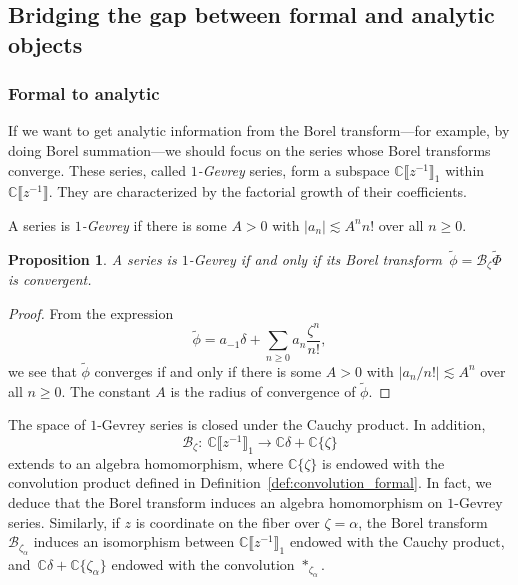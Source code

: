 \documentclass[pdftex]{sigma}
\newcommand{\maps}{\colon}
\newcommand{\C}{\mathbb{C}}
\newcommand{\series}[1]{\tilde{#1}}
\newcommand{\borel}{\mathcal{B}}
\numberwithin{equation}{section}
\newtheorem{Proposition}[Theorem]{Proposition}
 { \theoremstyle{definition}
\newtheorem{Definition}[Theorem]{Definition}
\newtheorem{Remark}[Theorem]{Remark}
\newtheorem*{notation*}{Notation}
}
\begin{document}
\subsection{Bridging the gap between formal and analytic objects}\label{sec:bridging}

\subsubsection{Formal to analytic}\label{sec:Borel-gevrey}
If we want to get analytic information from the Borel transform---for example, by doing Borel summation---we should focus on the series whose Borel transforms converge. These series, called {\em $1$-Gevrey} series, form a subspace $\C \big\llbracket z^{-1} \big\rrbracket_1$ within $\C \big\llbracket z^{-1} \big\rrbracket$. They are characterized by the factorial growth of their coefficients.
\begin{Definition}
A series
is {\em $1$-Gevrey} if there is some $A > 0$ with $|a_n| \lesssim A^n n!$ over all $n \ge 0$.
\end{Definition}
\begin{Proposition}\label{prop:gevrey_to_convergent}
A series
\smash{$ \series{\Phi} = \sum_{n \ge -1} a_n z^{-n-1}$}
is $1$-Gevrey if and only if its Borel transform~${\series{\phi} = \borel_\zeta \series{\Phi}}$ is convergent.
\end{Proposition}
\begin{proof}
From the expression
\[ \series{\phi} = a_{-1} \delta + \sum_{n \ge 0} a_n \frac{\zeta^n}{n!}, \]
we see that $\series{\phi}$ converges if and only if there is some $A > 0$ with $|a_n / n!| \lesssim A^n$ over all $n \ge 0$. The constant $A$ is the radius of convergence of $\series{\phi}$.
\end{proof}

The space of $1$-Gevrey series is closed under the Cauchy product. In addition,
\[\borel_\zeta\maps\ \C\big\llbracket z^{-1}\big\rrbracket_1\to\C\delta + \C\{\zeta\}\]
extends to an algebra homomorphism, where $\C\{\zeta\}$ is endowed with the convolution product defined in Definition~\ref{def:convolution_formal}. In fact, we deduce that the Borel transform induces an algebra homomorphism on $1$-Gevrey series. Similarly, if $z$ is coordinate on the fiber over $\zeta=\alpha$, the Borel transform $\borel_{\zeta_\alpha}$ induces an isomorphism between $\C\big\llbracket z^{-1}\big\rrbracket_1$ endowed with the Cauchy product, and~${\C\delta+\C\{\zeta_\alpha\}}$ endowed with the convolution $\ast_{\zeta_\alpha}$.
%
\end{document}
